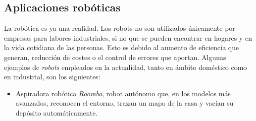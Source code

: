 \subsection{Aplicaciones robóticas}

La robótica es ya una realidad. Los robots no son utilizados únicamente por empresas para labores industriales, si no que se pueden encontrar en hogares y en la vida cotidiana de las personas. Esto es debido al aumento de eficiencia que generan, reducción de costes o el control de errores que aportan.  Algunas ejemplos de \textit{robots} empleados en la actualidad, tanto en ámbito doméstico como en industrial, son los siguientes:
\begin{itemize}
    \item Aspiradora robótica \textit{Roomba}, robot autónomo que, en los modelos más avanzados, reconocen el entorno, trazan un mapa de la casa y vacían su depósito automáticamente.


    \begin{figure}[H]
\centering

\end{figure}


\end{itemize}
